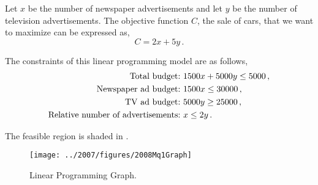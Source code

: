 %
%

\begin{subquestions}
	

\subquestion

Let $x$ be the number of newspaper advertisements and let $y$ be the number of television advertisements.	
The objective function $C$, the sale of cars, that we want to maximize can be expressed as,
\begin{equation}
	C =2x+5y \,.
\end{equation} 

The constraints of this linear programming model are as follows,
\begin{align}
	\text{Total budget:} \ & 1500x + 5000y \leq 5000 \,, \nonumber \\
	\text{Newspaper ad budget:} \ & 1500x \leq 30000 \,, \nonumber \\
	\text{TV ad budget:} \ & 5000y \geq 25000 \,, \nonumber \\
	\text{Relative number of advertisements:} \ & x \leq 2y \,.
\end{align}


\subquestion

\begin{subsubquestions}

	
\subsubquestion

The feasible region is shaded in .
\begin{figure}[H]
	\begin{center}
		\texttt{[image: ../2007/figures/2008Mq1Graph]}
		\caption{\label{2008M:q1:fig:Graph} Linear Programming Graph.}
	\end{center}
\end{figure}


\end{subsubquestions}
\end{subquestions}
